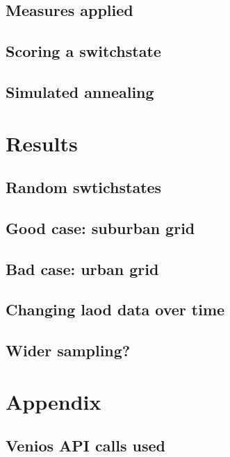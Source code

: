 \documentclass[a4paper]{report}
\begin{document}




\section{Measures applied}



\section{Scoring a switchstate}



\section{Simulated annealing}



\chapter{Results}

\section{Random swtichstates}




\section{Good case: suburban grid}

\section{Bad case: urban grid}

\section{Changing laod data over time}

\section{Wider sampling?}

\chapter{Appendix}

\section{Venios API calls used}



\printbibliography
\end{document}
